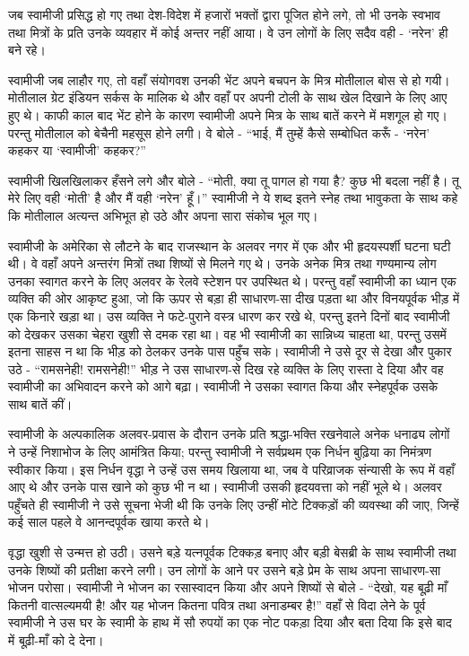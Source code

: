 \delimiter

जब स्वामीजी प्रसिद्ध हो गए तथा देश-विदेश में हजारों भक्तों द्वारा पूजित होने लगे, तो भी उनके स्वभाव तथा मित्रों के प्रति उनके व्यवहार में कोई अन्तर नहीं आया। वे उन लोगों के लिए सदैव वही - ‘नरेन’ ही बने रहे। 

स्वामीजी जब लाहौर गए, तो वहाँ संयोगवश उनकी भेंट अपने बचपन के मित्र मोतीलाल बोस से हो गयी। मोतीलाल ग्रेट इंडियन सर्कस के मालिक थे और वहाँ पर अपनी टोली के साथ खेल दिखाने के लिए आए हुए थे। काफी काल बाद भेंट होने के कारण स्वामीजी अपने मित्र के साथ बातें करने में मशगूल हो गए। परन्तु मोतीलाल को बेचैनी महसूस होने लगी। वे बोले - “भाई, मैं तुम्हें कैसे सम्बोधित करूँ - ‘नरेन’ कहकर या ‘स्वामीजी’ कहकर?” 

स्वामीजी खिलखिलाकर हँसने लगे और बोले - “मोती, क्या तू पागल हो गया है? कुछ भी बदला नहीं है। तू मेरे लिए वही ‘मोती’ है और मैं वही ‘नरेन’ हूँ।” स्वामीजी ने ये शब्द इतने स्नेह तथा भावुकता के साथ कहे कि मोतीलाल अत्यन्त अभिभूत हो उठे और अपना सारा संकोच भूल गए। 

\delimiter

स्वामीजी के अमेरिका से लौटने के बाद राजस्थान के अलवर नगर में एक और भी हृदयस्पर्शी घटना घटी थी। वे वहाँ अपने अन्तरंग मित्रों तथा शिष्यों से मिलने गए थे। उनके अनेक मित्र तथा गण्यमान्य लोग उनका स्वागत करने के लिए अलवर के रेलवे स्टेशन पर उपस्थित थे। परन्तु वहाँ स्वामीजी का ध्यान एक व्यक्ति की ओर आकृष्ट हुआ, जो कि ऊपर से बड़ा ही साधारण-सा दीख पड़ता था और विनयपूर्वक भीड़ में एक किनारे खड़ा था। उस व्यक्ति ने फटे-पुराने वस्त्र धारण कर रखे थे, परन्तु इतने दिनों बाद स्वामीजी को देखकर उसका चेहरा खुशी से दमक रहा था। वह भी स्वामीजी का सान्निध्य चाहता था, परन्तु उसमें इतना साहस न था कि भीड़ को ठेलकर उनके पास पहुँच सके। स्वामीजी ने उसे दूर से देखा और पुकार उठे - “रामसनेही! रामसनेही!” भीड़ ने उस साधारण-से दिख रहे व्यक्ति के लिए रास्ता दे दिया और वह स्वामीजी का अभिवादन करने को आगे बढ़ा। स्वामीजी ने उसका स्वागत किया और स्नेहपूर्वक उसके साथ बातें कीं। 

\delimiter

स्वामीजी के अल्पकालिक अलवर-प्रवास के दौरान उनके प्रति श्रद्धा-भक्ति रखनेवाले अनेक धनाढ्य लोगों ने उन्हें निशाभोज के लिए आमंत्रित किया; परन्तु स्वामीजी ने सर्वप्रथम एक निर्धन बुढ़िया का निमंत्रण स्वीकार किया। इस निर्धन वृद्धा ने उन्हें उस समय खिलाया था, जब वे परिव्राजक संन्यासी के रूप में वहाँ आए थे और उनके पास खाने को कुछ भी न था। स्वामीजी उसकी हृदयवत्ता को नहीं भूले थे। अलवर पहुँचते ही स्वामीजी ने उसे सूचना भेजी थी कि उनके लिए उन्हीं मोटे टिक्कड़ों की व्यवस्था की जाए, जिन्हें कई साल पहले वे आनन्दपूर्वक खाया करते थे। 

वृद्धा खुशी से उन्मत्त हो उठी। उसने बड़े यत्नपूर्वक टिक्कड़ बनाए और बड़ी बेसब्री के साथ स्वामीजी तथा उनके शिष्यों की प्रतीक्षा करने लगी। उन लोगों के आने पर उसने बड़े प्रेम के साथ अपना साधारण-सा भोजन परोसा। स्वामीजी ने भोजन का रसास्वादन किया और अपने शिष्यों से बोले - “देखो, यह बूढ़ी माँ कितनी वात्सल्यमयी है! और यह भोजन कितना पवित्र तथा अनाडम्बर है!” वहाँ से विदा लेने के पूर्व स्वामीजी ने उस घर के स्वामी के हाथ में सौ रुपयों का एक नोट पकड़ा दिया और बता दिया कि इसे बाद में बूढ़ी-माँ को दे देना। 

